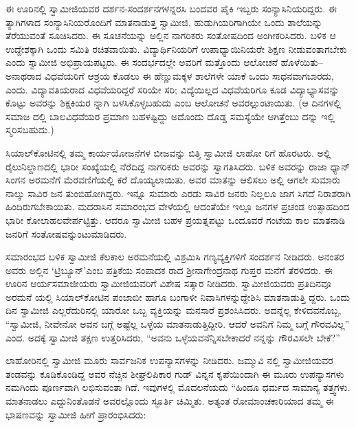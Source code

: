 ಈ ಊರಿನಲ್ಲಿ ಸ್ವಾಮೀಜಿಯವರ ದರ್ಶನ-ಸಂದರ್ಶನಗಳನ್ನರಸಿ ಬಂದವರ ಪೈಕಿ ಇಬ್ಬರು ಸಂನ್ಯಾಸಿನಿಯರಿದ್ದರು. ಈ ತ್ಯಾಗಿಗಳಾದ ಸಂನ್ಯಾಸಿನಿಯರೊಂದಿಗೆ ಮಾತನಾಡುತ್ತ ಸ್ವಾಮೀಜಿ, ಹುಡುಗಿಯರಿಗಾಗಿಯೇ ಒಂದು ಶಾಲೆಯನ್ನು ತೆರೆಯುವಂತೆ ಸೂಚಿಸಿದರು. ಈ ಸೂಚನೆಯನ್ನು ಅಲ್ಲಿನ ನಾಗರಿಕರು ಸಂತೋಷದಿಂದ ಅಂಗೀಕರಿಸಿದರು. ಬಳಿಕ ಆ ಉದ್ದೇಶಕ್ಕಾಗಿ ಒಂದು ಸಮಿತಿ ರಚಿತವಾಯಿತು. ವಿದ್ಯಾರ್ಥಿನಿಯರಿಗೆ ಉಪಾಧ್ಯಾಯಿನಿಯರೇ ಶಿಕ್ಷಣ ನೀಡುವಂತಾಗಬೇಕು ಎಂದು ಸ್ವಾಮೀಜಿ ಅಭಿಪ್ರಾಯಪಟ್ಟರು. ಈ ಸಂದರ್ಭದಲ್ಲೇ ಅವರಿಗೆ ಮತ್ತೊಂದು ಆಲೋಚನೆ ಹೊಳೆಯಿತು–ಅನಾಥರಾದ ವಿಧವೆಯರಿಗೆ ಆಶ್ರಯ ಕೊಡಲು ಈ ಹೆಣ್ಣುಮಕ್ಕಳ ಶಾಲೆಗಳೇ ಯಾಕೆ ಒಂದು ಸಾಧನವಾಗಬಾರದು, ಎಂದು. ವಿದ್ಯಾವತಿಯರಾದ ವಿಧವೆಯರಿದ್ದರೆ ಸರಿಯೇ ಸರಿ; ವಿದ್ಯೆಯಿಲ್ಲದ ವಿಧವೆಯರಿಗೂ ಕೂಡ ವಿದ್ಯಾಭ್ಯಾಸವನ್ನು ಕೊಟ್ಟು ಅವರನ್ನು ಶಿಕ್ಷಕಿಯರ ನ್ನಾಗಿ ಬಳಸಿಕೊಳ್ಳಬಹುದು ಎಂಬ ಆಲೋಚನೆ ಅವರಲ್ಲುಂಟಾಯಿತು. (ಆ ದಿನಗಳಲ್ಲಿ ಸಮಾಜ ದಲ್ಲಿ ಬಾಲವಿಧವೆಯರ ಪ್ರಮಾಣ ಬಹಳಷ್ಟಿದ್ದು ಅದೊಂದು ದೊಡ್ಡ ಸಮಸ್ಯೆಯೇ ಆಗಿತ್ತೆಂಬು ದನ್ನು ಇಲ್ಲಿ ಸ್ಮರಿಸಬಹುದು.)

ಸಿಯಾಲ್​ಕೋಟಿನಲ್ಲಿ ತಮ್ಮ ಕಾರ್ಯಯೋಜನೆಗಳ ಬೀಜವನ್ನು ಬಿತ್ತಿ ಸ್ವಾಮೀಜಿ ಲಾಹೋ ರಿಗೆ ಹೊರಟರು. ಅಲ್ಲಿ ರೈಲುನಿಲ್ದಾಣದಲ್ಲಿ ಭಾರೀ ಸಂಖ್ಯೆಯಲ್ಲಿ ನೆರೆದಿದ್ದ ನಾಗರಿಕರು ಅವರನ್ನು ಸ್ವಾಗತಿಸಿದರು. ಬಳಿಕ ಅವರನ್ನು ರಾಜಾ ಧ್ಯಾನ್ ಸಿಂಗನ ಅರಮನೆಗೆ ಮೆರವಣಿಗೆಯಲ್ಲಿ ಕರೆ ದೊಯ್ಯಲಾಯಿತು. ಅವರ ಮಾತನ್ನು ಆಲಿಸಲು ಅಲ್ಲಿ ಆಗಲೇ ಸುಮಾರು ನಾಲ್ಕು ಸಾವಿರ ಜನ ತುಂಬಿಹೋಗಿದ್ದರು. ಇನ್ನೂ ಸುಮಾರು ಎರಡು ಸಾವಿರ ಜನರು ನಿಲ್ಲಲೂ ಜಾಗ ಸಿಗದೆ ನಿರಾಶರಾಗಿ ಹಿಂದಿರುಗಬೇಕಾಯಿತು. ಮದರಾಸಿನ ಸಮಾರಂಭದ ವೇಳೆಯಲ್ಲಿ ಆದಂತೆಯೇ ಇಲ್ಲೂ ಜನಗಳ ಪ್ರಚಂಡ ಉತ್ಸಾಹದಿಂದ ಭಾರೀ ಕೋಲಾಹಲವೇರ್ಪಟ್ಟಿತ್ತು. ಆದರೂ ಸ್ವಾಮೀಜಿ ಬಹಳ ಪ್ರಯತ್ನಪಟ್ಟು ಒಂದೂವರೆ ಗಂಟೆಯ ಕಾಲ ಮಾತನಾಡಿ ಜನರಿಗೆ ಸಂತೋಷವನ್ನುಂಟುಮಾಡಿದರು.

ಸಮಾರಂಭದ ಬಳಿಕ ಸ್ವಾಮೀಜಿ ಕೆಲಕಾಲ ಅರಮನೆಯಲ್ಲಿ ವಿಶ್ರಮಿಸಿ ಗಣ್ಯವ್ಯಕ್ತಿಗಳಿಗೆ ಸಂದರ್ಶನ ನೀಡಿದರು. ಅನಂತರ ಅವರು ಅಲ್ಲಿನ ‘ಟ್ರಿಬ್ಯೂನ್​’ಎಂಬ ಪತ್ರಿಕೆಯ ಸಂಪಾದಕ ರಾದ ಶ್ರೀನಾಗೇಂದ್ರನಾಥ ಗುಪ್ತರ ಮನೆಗೆ ತೆರಳಿದರು. ಈ ಊರಿನ ಆರ್ಯಸಮಾಜೀಯರು ಸ್ವಾಮೀಜಿಯವರಿಗೆ ವಿಶೇಷ ಸತ್ಕಾರ ನೀಡಿದರು. ಸ್ವಾಮೀಜಿಯವರು ಪ್ರತಿದಿನವೂ ಅರಮನೆ ಯಲ್ಲಿ ಸಿಯಾಲ್​ಕೋಟಿನ ಪಂಜಾಬೀ ಹಾಗೂ ಬಂಗಾಳೀ ನಿವಾಸಿಗಳನ್ನುದ್ದೇಶಿಸಿ ಮಾತನಾಡುತ್ತಿ ದ್ದರು. ಒಂದು ದಿನ ಸ್ವಾಮೀಜಿ ಎಲ್ಲರೆದುರಿನಲ್ಲಿ ಯಾರೋ ಒಬ್ಬ ವ್ಯಕ್ತಿಯನ್ನು ಮನಸಾರೆ ಪ್ರಶಂಸಿಸಿದರು. ಅದನ್ನೆಲ್ಲ ಕೇಳಿದವನೊಬ್ಬ, “ಸ್ವಾಮೀಜಿ, ನೀವೇನೋ ಅವನ ಬಗ್ಗೆ ಅಷ್ಟೆಲ್ಲ ಒಳ್ಳೆಯ ಮಾತನಾಡುತ್ತಿದ್ದೀರಿ. ಆದರೆ ಅವನಿಗೆ ನಿಮ್ಮ ಬಗ್ಗೆ ಗೌರವವಿಲ್ಲ” ಎಂದ. ಅದಕ್ಕೆ ಸ್ವಾಮೀಜಿ ತಕ್ಷಣ ಉತ್ತರಿಸಿದರು, “ಅವನು ಒಳ್ಳೆಯವನೆನ್ನಿಸಬೇಕಾದರೆ ನನ್ನನ್ನು ಗೌರವಿಸಲೇ ಬೇಕೆ?”

ಲಾಹೋರಿನಲ್ಲಿ ಸ್ವಾಮೀಜಿ ಮೂರು ಸಾರ್ವಜನಿಕ ಉಪನ್ಯಾಸಗಳನ್ನು ನೀಡಿದರು. ಜಮ್ಮುವಿ ನಲ್ಲಿ ಸ್ವಾಮೀಜಿಯವರ ತಂಡವನ್ನು ಕೂಡಿಕೊಂಡಿದ್ದ ಅವರ ನೆಚ್ಚಿನ ಶೀಘ್ರಲಿಪಿಕಾರ ಗುಡ್ ವಿನ್ನನ ಕೃಪೆಯಿಂದಾಗಿ ಈ ಮೂರು ಉಪನ್ಯಾಸಗಳು ನಮಗಿಂದು ಪೂರ್ಣವಾಗಿ ಲಭಿಸುವಂತಾ ಗಿದೆ. ಇವುಗಳಲ್ಲಿ ಮೊದಲನೆಯದು “ಹಿಂದೂ ಧರ್ಮದ ಸಾಮಾನ್ಯ ತತ್ತ್ವಗಳು. ಮಾತನಾಡಲು ಎದ್ದುನಿಂತೊಡನೆ ಅವರಲ್ಲೊಂದು ಸ್ಫೂರ್ತಿ ಚಿಮ್ಮಿತು. ಅತ್ಯಂತ ರೋಮಾಂಚಕಾರಿಯಾದ ತಮ್ಮ ಈ ಭಾಷಣವನ್ನು ಸ್ವಾಮೀಜಿ ಹೀಗೆ ಪ್ರಾರಂಭಿಸಿದರು:

